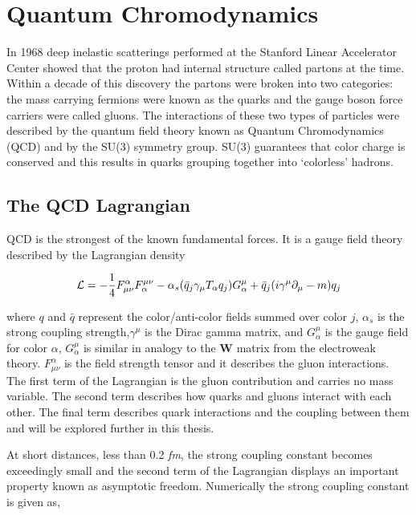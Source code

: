 
\chapter{Quantum Chromodynamics} \label{ch:qcd}
In 1968 deep inelastic scatterings performed at the Stanford Linear Accelerator Center showed that the proton had internal structure\cite{Riordan1287} called partons at the time.  Within a decade of this discovery the partons were broken into two categories: the mass carrying fermions were known as the quarks and the gauge boson force carriers were called gluons.  The interactions of these two types of particles were described by the quantum field theory known as Quantum Chromodynamics (QCD) and by the SU(3) symmetry group.  SU(3) guarantees that color charge is conserved and this results in quarks grouping together into `colorless' hadrons.

\section{The QCD Lagrangian}
QCD is the strongest of the known fundamental forces.  It is a gauge field theory described by the Lagrangian density

\begin{equation}
{\cal L}=-\frac{1}{4}F^{\alpha}_{\mu\nu}F^{\mu\nu}_{\alpha}
- \alpha_{s} (\bar{q}_{j}\gamma_{\mu}T_{\alpha}q_{j})G_{\alpha}^{\mu}
+ \bar{q}_{j}(i\gamma^{\mu} \partial_{\mu} - m)q_{j}
\label{eq:lagrangian}
\end{equation}

\noindent
where $q$ and $\bar{q}$ represent the color/anti-color fields summed over color $j$, $\alpha_{s}$ is the strong coupling strength,$\gamma^{\mu}$ is the Dirac gamma matrix, and $G_{\alpha}^{\mu}$ is the gauge field for color \textit{$\alpha$}, $G_{\alpha}^{\mu}$ is similar in analogy to the \textbf{W} matrix from the electroweak theory.  $F^{\alpha}_{\mu\nu}$ is the field strength tensor and it describes the gluon interactions. The first term of the Lagrangian is the gluon contribution and carries no mass variable.  The second term describes how quarks and gluons interact with each other. The final term describes quark interactions and the coupling between them and will be explored further in this thesis.

At short distances, less than 0.2 \textit{fm}, the strong coupling constant becomes exceedingly small and the second term of the Lagrangian displays an important property known as asymptotic freedom\cite{Wilczek:2005az}.  Numerically the strong coupling constant is given as,

